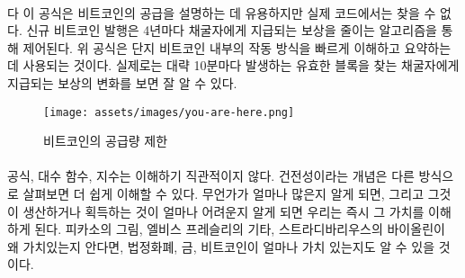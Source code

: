 \paragraph{}
\begin{comment}	
	While this formula is useful to describe Bitcoin's supply, it is actually
	nowhere to be found in the code. Issuance of new bitcoin is done in an
	algorithmically controlled fashion, by reducing the reward which is paid to
	miners every four years~\cite{btcwiki:supply}. The formula above is used to
	quickly sum up what is happening under the hood. What really happens can be best
	seen by looking at the change in block reward, the reward paid out to whoever
	finds a valid block, which roughly happens every 10 minutes.
\end{comment}다
이 공식은 비트코인의 공급을 설명하는 데 유용하지만 실제 코드에서는 찾을 수 없다. 
신규 비트코인 발행은 4년마다 채굴자에게 지급되는 보상을 줄이는 알고리즘을 통해 제어된다.\cite{btcwiki:supply}
위 공식은 단지 비트코인 내부의 작동 방식을 빠르게 이해하고 요약하는 데 사용되는 것이다. 
실제로는 대략 10분마다 발생하는 유효한 블록을 찾는 채굴자에게 지급되는 보상의 변화를 보면 잘 알 수 있다.

\begin{figure}
	\texttt{[image: assets/images/you-are-here.png]}
	\caption{비트코인의 공급량 제한}
	\label{fig:you-are-here.png}
\end{figure}

\paragraph{}
\begin{comment}	
	Formulas, logarithmic functions and exponentials are not exactly
	intuitive to understand. The concept of \textit{soundness} might be easier to
	understand if looked at in another way. Once we know how much there is
	of something, and once we know how hard this something is to produce or
	get our hands on, we immediately understand its value. What is true for
	Picasso's paintings, Elvis Presley's guitars, and Stradivarius violins
	is also true for fiat currency, gold, and bitcoins.
\end{comment}
공식, 대수 함수, 지수는 이해하기 직관적이지 않다. 
건전성이라는 개념은 다른 방식으로 살펴보면 더 쉽게 이해할 수 있다.
무언가가 얼마나 많은지 알게 되면, 그리고 그것이 생산하거나 획득하는 것이 얼마나 어려운지 알게 되면 
우리는 즉시 그 가치를 이해하게 된다. 
피카소의 그림, 엘비스 프레슬리의 기타, 스트라디바리우스의 바이올린이 왜 가치있는지 안다면,
법정화폐, 금, 비트코인이 얼마나 가치 있는지도 알 수 있을 것이다.

